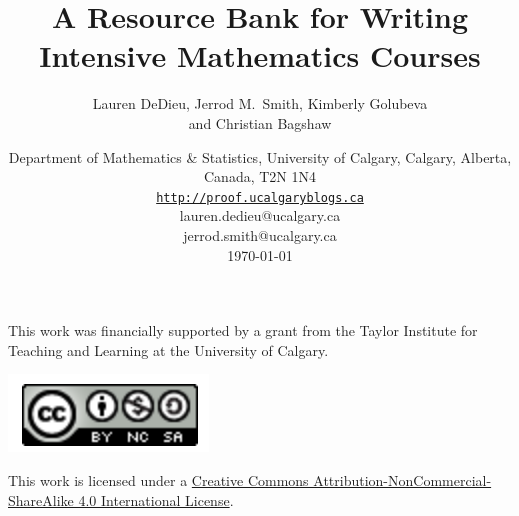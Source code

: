 \documentclass[12pt]{book}
\begin{document}
\title{A Resource Bank for Writing Intensive Mathematics Courses}

\author{Lauren DeDieu, Jerrod M.~Smith, Kimberly Golubeva\\ and Christian Bagshaw}

\date{%
Department of Mathematics \& Statistics, University of Calgary, Calgary, Alberta, Canada, T2N 1N4\\
\href{http://proof.ucalgaryblogs.ca}{\texttt{http://proof.ucalgaryblogs.ca}}\\[2ex]%
lauren.dedieu@ucalgary.ca\\
jerrod.smith@ucalgary.ca\\[2ex]
\today
}

\maketitle

\vspace{50cm}

\begin{center}

This work was financially supported by a grant from the Taylor Institute for Teaching and Learning at the University of Calgary.

\bigskip
\bigskip
\bigskip
\bigskip



\includegraphics{CC.PNG}

\smallskip

This work is licensed under a \href{http://creativecommons.org/licenses/by-nc-sa/4.0/}{Creative Commons Attribution-NonCommercial-ShareAlike 4.0 International License}.

\end{center}




\clearpage
\setcounter{tocdepth}{1}
\tableofcontents

\end{document}

